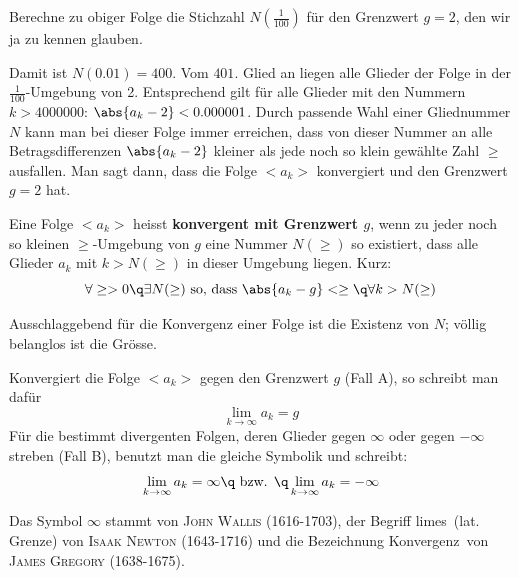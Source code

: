 \documentclass[%
11pt,%
twoside,%
titlepage,%
german,%
headsepline%
]{scrartcl}
\begin{document}
\begin{ueb}[Stichzahl]
Berechne zu obiger Folge die Stichzahl $N(\frac{1}{100})$ f\"ur den Grenzwert $g=2$, den wir ja zu kennen glauben.
\end{ueb}

Damit ist $N(0.01) = 400$. Vom $401.$ Glied an liegen alle
Glieder der Folge in der $\frac{1}{100}$-Umgebung von 2. Entsprechend gilt f\"ur alle Glieder mit den Nummern $k > 4000000$: $\abs{a_k - 2} < 0.000001$. Durch passende Wahl einer Gliednummer $N$ kann man bei dieser Folge immer erreichen, dass von dieser Nummer an alle Betragsdifferenzen $\abs{a_k - 2}$ kleiner als jede noch so klein gew\"ahlte Zahl $\ge$ ausfallen. Man sagt dann, dass
die Folge $<a_k>$ konvergiert und den
Grenzwert $g=2$ hat.

\begin{cdef}[Konvergenz]{}
Eine
Folge $<a_k>$ heisst \textbf{konvergent mit Grenzwert $g$}, wenn zu jeder noch so kleinen $\ge$-Umgebung von $g$ eine Nummer $N(\ge)$ so existiert, dass alle Glieder $a_k$ mit $k > N(\ge)$ in dieser Umgebung liegen. Kurz:
$$\forall\ge>0\q\exists N(\ge)\text{ so, dass }\abs{a_k-g}<\ge\q\forall k>N(\ge)$$
\end{cdef}

\begin{bem}
Ausschlaggebend f\"ur die Konvergenz einer Folge ist die Existenz von $N$; v\"ollig belanglos ist die Gr\"osse.
\end{bem}

\begin{bem}
Konvergiert die Folge $<a_k>$ gegen den Grenzwert $g$ (Fall A), so schreibt man daf\"ur
$$\lim_{k\to\infty}a_k=g$$
F\"ur die bestimmt divergenten Folgen, deren Glieder gegen $\infty$ oder gegen $-\infty$ streben (Fall B), benutzt man die gleiche Symbolik und schreibt:
$$\lim_{k\to\infty}a_k=\infty\q\text { bzw. }\q\lim_{k\to\infty}a_k=-\infty$$
\end{bem}
Das Symbol $\infty$ stammt von \textsc{John Wallis} (1616-1703), der Begriff \glqq limes\grqq\ (lat. Grenze) von \textsc{Isaak Newton} (1643-1716) und die Bezeichnung \glqq Konvergenz\grqq\ von \textsc{James Gregory} (1638-1675).
\end{document}
